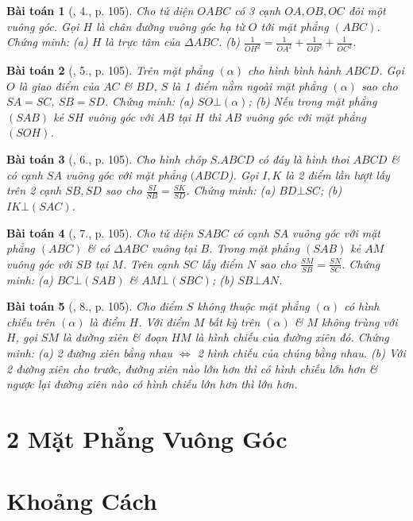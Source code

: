 \documentclass{article}
\numberwithin{equation}{section}
\newtheorem{baitoan}{Bài toán}
\begin{document}
\begin{baitoan}[\cite{SGK_Toan_11_hinh_hoc_co_ban}, 4., p. 105]
	Cho tứ diện $OABC$ có 3 cạnh $OA,OB,OC$ đôi một vuông góc. Gọi $H$ là chân đường vuông góc hạ từ $O$ tới mặt phẳng $(ABC)$. Chứng minh: (a) $H$ là trực tâm của $\Delta ABC$. (b) $\frac{1}{OH^2} = \frac{1}{OA^2} + \frac{1}{OB^2} + \frac{1}{OC^2}$. 
\end{baitoan}

\begin{baitoan}[\cite{SGK_Toan_11_hinh_hoc_co_ban}, 5., p. 105]
	Trên mặt phẳng $(\alpha)$ cho hình bình hành $ABCD$. Gọi $O$ là giao điểm của $AC$ \& $BD$, $S$ là 1 điểm nằm ngoài mặt phẳng $(\alpha)$ sao cho $SA = SC$, $SB = SD$. Chứng minh: (a) $SO\bot(\alpha)$; (b) Nếu trong mặt phẳng $(SAB)$ kẻ $SH$ vuông góc với $AB$ tại $H$ thì $AB$ vuông góc với mặt phẳng $(SOH)$.
\end{baitoan}

\begin{baitoan}[\cite{SGK_Toan_11_hinh_hoc_co_ban}, 6., p. 105]
	Cho hình chóp $S.ABCD$ có đáy là hình thoi $ABCD$ \& có cạnh $SA$ vuông góc với mặt phẳng $(ABCD$). Gọi $I,K$ là 2 điểm lần lượt lấy trên 2 cạnh $SB,SD$ sao cho $\frac{SI}{SB} = \frac{SK}{SD}$. Chứng minh: (a) $BD\bot SC$; (b) $IK\bot(SAC)$.
\end{baitoan}

\begin{baitoan}[\cite{SGK_Toan_11_hinh_hoc_co_ban}, 7., p. 105]
	Cho tứ diện $SABC$ có cạnh $SA$ vuông góc với mặt phẳng $(ABC)$ \& có $\Delta ABC$ vuông tại $B$. Trong mặt phẳng $(SAB)$ kẻ $AM$ vuông góc với $SB$ tại $M$. Trên cạnh $SC$ lấy điểm $N$ sao cho $\frac{SM}{SB} = \frac{SN}{SC}$. Chứng minh: (a) $BC\bot(SAB)$ \& $AM\bot(SBC)$; (b) $SB\bot AN$.
\end{baitoan}

\begin{baitoan}[\cite{SGK_Toan_11_hinh_hoc_co_ban}, 8., p. 105]
	Cho điểm $S$ không thuộc mặt phẳng $(\alpha)$ có hình chiếu trên $(\alpha)$ là điểm $H$. Với điểm $M$ bất kỳ trên $(\alpha)$ \& $M$ không trùng với $H$, gọi $SM$ là đường xiên \& đoạn $HM$ là hình chiếu của đường xiên đó. Chứng minh: (a) 2 đường xiên bằng nhau $\Leftrightarrow$ 2 hình chiếu của chúng bằng nhau. (b) Với 2 đường xiên cho trước, đường xiên nào lớn hơn thì có hình chiếu lớn hơn \& ngược lại đường xiên nào có hình chiếu lớn hơn thì lớn hơn.
\end{baitoan}


\section{2 Mặt Phẳng Vuông Góc}


\section{Khoảng Cách}


\printbibliography[heading=bibintoc]
	
\end{document}
